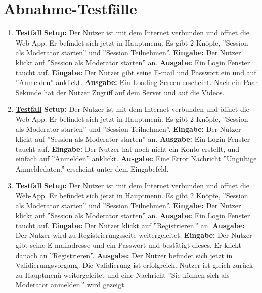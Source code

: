 \section{Abnahme-Testfälle}
\begin{enumerate}
	\item \underline{\textbf{Testfall}} \linebreak
	\textbf{Setup:} Der Nutzer ist mit dem Internet verbunden und öffnet die Web-App. Er befindet sich jetzt in Hauptmenü. Es gibt 2 Knöpfe, ''Session als Moderator starten'' und ''Session Teilnehmen''.\linebreak
	\textbf{Eingabe:} Der Nutzer klickt auf ''Session als Moderator starten'' an.\linebreak
	\textbf{Ausgabe:} Ein Login Fenster taucht auf.\linebreak
	\textbf{Eingabe:} Der Nutzer gibt seine E-mail und Passwort ein und auf ''Anmelden'' anklickt.\linebreak
	\textbf{Ausgabe:} Ein Loading Screen erscheint. Nach ein Paar Sekunde hat der Nutzer Zugriff auf dem Server und auf die Videos.
	
	\item \underline{\textbf{Testfall}} \linebreak
	\textbf{Setup:} Der Nutzer ist mit dem Internet verbunden und öffnet die Web-App. Er befindet sich jetzt in Hauptmenü. Es gibt 2 Knöpfe, ''Session als Moderator starten'' und ''Session Teilnehmen''. \linebreak
	\textbf{Eingabe:} Der Nutzer klickt auf ''Session als Moderator starten'' an. \linebreak
	\textbf{Ausgabe:} Ein Login Fenster taucht auf.\linebreak
	\textbf{Eingabe:} Der Nutzer hat noch nicht ein Konto erstellt, und einfach auf ''Anmelden'' anklickt.\linebreak
	\textbf{Ausgabe:} Eine Error Nachricht ''Ungültige Anmeldedaten.'' erscheint unter dem Eingabefeld.
	
	\item \underline{\textbf{Testfall}} \linebreak
	\textbf{Setup:} Der Nutzer ist mit dem Internet verbunden und öffnet die Web-App. Er befindet sich jetzt in Hauptmenü. Es gibt 2 Knöpfe, ''Session als Moderator starten'' und ''Session Teilnehmen''.\linebreak
	\textbf{Eingabe:} Der Nutzer klickt auf ''Session als Moderator starten'' an. \linebreak
	\textbf{Ausgabe:} Ein Login Fenster taucht auf.\linebreak
	\textbf{Eingabe:} Der Nutzer klickt auf ''Registrieren.'' an.\linebreak
	\textbf{Ausgabe:} Der Nutzer wird zu Registrierungsseite weitergeleitet.\linebreak
	\textbf{Eingabe:} Der Nutzer gibt seine E-mailadresse und ein Passwort und bestätigt dieses. Er klickt danach an ''Registrieren''. \linebreak
	\textbf{Ausgabe:} Der Nutzer befindet sich jetzt in Validierungsvorgang. Die Validierung ist erfolgreich. Nutzer ist gleich zurück zu Hauptmenü weitergeleitet und eine Nachricht ''Sie können sich als Moderator anmelden.'' wird gezeigt.
	

\end{enumerate}
